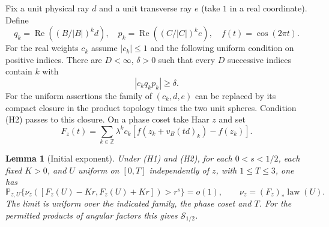 \documentclass[11pt,a4paper]{article}
\newtheorem{lemma}[theorem]{Lemma}
\begin{document}
Fix a unit physical ray $d$ and a unit transverse ray $e$ (take $1$ in a
real coordinate). Define
\[
 q_k=\operatorname{Re}((B/|B|)^k d),\quad
 p_k=\operatorname{Re}((C/|C|)^k e),\quad f(t)=\cos(2\pi t).
\]
For the real weights $c_k$ assume $|c_k|\le1$ and the following uniform
condition on positive indices. There are $D<\infty$, $\delta>0$ such that
every $D$ successive indices contain $k$ with
\[
                       |c_k q_k p_k|\ge\delta .              \tag{H2}
\]
For the uniform assertions the family of $(c_k,d,e)$ can be replaced
by its compact closure in the product topology times the two unit spheres.
Condition (H2) passes to this closure. On a phase coset take Haar $z$ and set
\[
 F_z(t)=\sum_{k\in\mathbb Z}\lambda^k c_k
    [f(z_k+v_B(td)_k)-f(z_k)].
\]
\begin{lemma}[Initial exponent]\label{lem:half}
Under (H1) and (H2), for each $0<s<1/2$, each fixed $K>0$, and $U$ uniform on $[0,T]$
independently of $z$, with $1\le T\le3$, one has
\[
 \mathbb P_{z,U}\{\nu_z([F_z(U)-Kr,F_z(U)+Kr])>r^s\}=o(1),
 \qquad \nu_z=(F_z)_*\operatorname{law}(U).                   \tag{H3}
\]
The limit is uniform over the indicated family, the phase coset and $T$.
For the permitted products of angular factors this gives $\mathcal S_{1/2}$.
\end{lemma}
\end{document}
